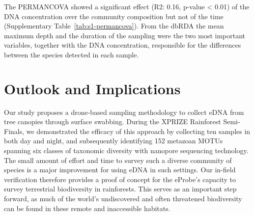 The PERMANCOVA showed a significant effect (R2: 0.16, p-value < 0.01) of the DNA concentration over the community composition but not of the time (Supplementary Table~\ref{tab:s1-permancova}). From the dbRDA the mean maximum depth and the duration of the sampling were the two most important variables, together with the DNA concentration, responsible for the differences between the species detected in each sample.

\section{Outlook and Implications}
\label{sec:outlook}

Our study proposes a drone-based sampling methodology to collect \gls{eDNA} from tree canopies through surface swabbing. During the XPRIZE Rainforest Semi-Finals, we demonstrated the efficacy of this approach by collecting ten samples in both day and night, and subsequently identifying 152 metazoan \glspl{MOTU} spanning six classes of taxonomic diversity with nanopore sequencing technology. The small amount of effort and time to survey such a diverse community of species is a major improvement for using eDNA in such settings. Our in-field verification therefore provides a proof of concept for the eProbe’s capacity to survey terrestrial biodiversity in rainforests. This serves as an important step forward, as much of the world's undiscovered and often threatened biodiversity can be found in these remote and inaccessible habitats.


